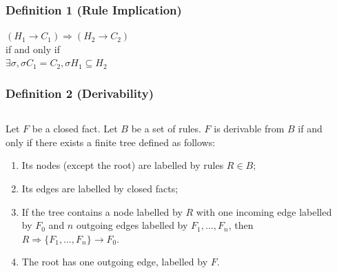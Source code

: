 \documentclass[10pt]{beamer}
\begin{document}
\begin{frame}
  \frametitle{Definition 1 (Rule Implication)}
  \centering

  $(H_1 \rightarrow C_1) \Rightarrow (H_2 \rightarrow C_2)$\\
  if and only if\\
  $\exists \sigma, \sigma C_1 = C_2, \sigma H_1 \subseteq H_2$
\end{frame}

\begin{frame}
  \frametitle{Definition 2 (Derivability)}

  \begin{columns}
    \begin{column}{.6\textwidth}
      Let $F$ be a closed fact.
      Let $B$ be a set of rules.
      $F$ is derivable from $B$ if and only if there exists a finite tree defined as follows:
      \begin{enumerate}
        \item Its nodes (except the root) are labelled by rules $R \in B$;
        \item Its edges are labelled by closed facts;
        \item If the tree contains a node labelled by $R$ with one incoming edge labelled by $F_0$ and $n$ outgoing edges labelled by $F_1, \dots, F_n$, then $R \Rightarrow \{F_1, \dots, F_n\} \rightarrow F_0$.
        \item The root has one outgoing edge, labelled by $F$.
      \end{enumerate}
    \end{column}
    \begin{column}{.4\textwidth}

\end{column}
\end{columns}
\end{frame}
\end{document}
